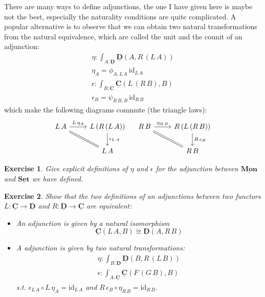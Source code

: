 \documentclass{article}
\newcommand{\Set}{\mathbf{Set}}
\newcommand{\cat}[1]{\underline{\mathbf{#1}}}
\newcommand{\id}{\mathrm{id}}
\newtheorem{exercise}{Exercise}
\begin{document}
There are many ways to define adjunctions, the one I have given here is maybe not the best, especially the naturality conditions are quite complicated. A popular alternative is to observe that we can obtain two natural transformations from the natural equivalence, which are called the unit and the counit of an adjunction:
\begin{align*}
  \eta : \int_{A:\cat{D}} \cat{D}(A,R\,(L\,A)) \\
  \eta_A = \phi_{A,L\,A}\,\id_{L\,A} \\
  \epsilon : \int_{B:\cat{C}} \cat{C}(L\,(R\,B),B) \\
  \epsilon_B = \psi_{R\,B,B}\,\id_{R\,B}
\end{align*}
which make the following diagrams commute (the triangle laws):
\[\begin{tikzcd}
L\,A \arrow[rd,equal] \arrow[r,"L\,\eta_{A}"] &   L\,(R\,(L\,A))\arrow[d,"\epsilon_{L\,A}"]\\
& L\,A
\end{tikzcd}
\quad
\begin{tikzcd}
R\,B \arrow[rd,equal] \arrow[r,"\eta_{R\,B}"] &   R\,(L\,(R\,B)) \arrow[d,"R\,\epsilon_B"]\\
& R\,B
\end{tikzcd}
\]

\begin{exercise}
 Give explicit definitions of $\eta$ and $\epsilon$ for the adjunction between $\cat{Mon}$ and $\cat{\Set}$ we have defined.
\end{exercise}

\begin{exercise}
  Show that the two definitions of an adjunctions between two functors $L : \cat{C} \to \cat{D}$ and $R : \cat{D} \to \cat{C}$ are equivalent: 
  \begin{itemize}
  \item An adjunction is given by a natural isomorphism 
    \[ \cat{C}(L\,A,B)  \cong \cat{D}(A,R\,B)  \]
  \item A adjunction is given by two natural transformations: 
    \begin{align*}
      \eta : \int_{B:\cat{D}} \cat{D}(B,R\,(L\,B))\\
      \epsilon : \int_{A:\cat{C}} \cat{C}(F\,(G\,B),B) 
    \end{align*}
    s.t. $\epsilon_{L\,A} \circ L\,\eta_A = \id_{L\,A}$ and $R\,\epsilon_B \circ \eta_{R\,B} = \id_{R\,B}$.
  \end{itemize}
\end{exercise}
\end{document}
